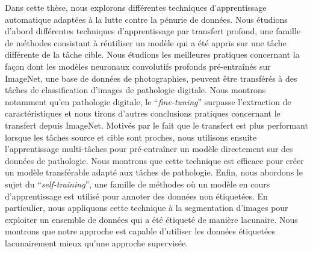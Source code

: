 Dans cette thèse, nous explorons différentes techniques d'apprentissage automatique adaptées à la lutte contre la pénurie de données. Nous étudions d'abord différentes techniques d'apprentissage par transfert profond, une famille de méthodes consistant à réutiliser un modèle qui a été appris sur une tâche différente de la tâche cible. Nous étudions les meilleures pratiques concernant la façon dont les modèles neuronaux convolutifs profonds pré-entraînés sur ImageNet, une base de données de photographies, peuvent être transférés à des tâches de classification d'images de pathologie digitale. Nous montrons notamment qu'en pathologie digitale, le ``\textit{fine-tuning}'' surpasse l'extraction de caractéristiques et nous tirons d'autres conclusions pratiques concernant le transfert depuis ImageNet. Motivés par le fait que le transfert est plus performant lorsque les tâches source et cible sont proches, nous utilisons ensuite l'apprentissage multi-tâches pour pré-entraîner un modèle directement sur des données de pathologie. Nous montrons que cette technique est efficace pour créer un modèle transférable adapté aux tâches de pathologie. Enfin, nous abordons le sujet du ``\textit{self-training}'', une famille de méthodes où un modèle en cours d'apprentissage est utilisé pour annoter des données non étiquetées. En particulier, nous appliquons cette technique à la segmentation d'images pour exploiter un ensemble de données qui a été étiqueté de manière lacunaire. Nous montrons que notre approche est capable d'utiliser les données étiquetées lacunairement mieux qu'une approche supervisée. 

